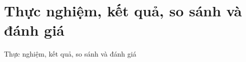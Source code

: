 \chapter{Thực nghiệm, kết quả, so sánh và đánh giá}
\label{chap4}

Thực nghiệm, kết quả, so sánh và đánh giá
